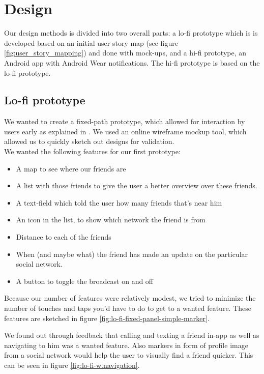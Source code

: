 \documentclass[runningheads,a4paper]{llncs}
\begin{document}
\section{Design}\label{design}
Our design methods is divided into two overall parts: a lo-fi prototype which is is developed based on an initial user story map (see figure \ref{fig:user_story_mapping}) and done with mock-ups, and a hi-fi prototype, an Android app with Android Wear notifications. The hi-fi prototype is based on the lo-fi prototype. 

\subsection{Lo-fi prototype}
We wanted to create a fixed-path prototype, which allowed for interaction by users early as explained in \cite{prototyping}. We used an online wireframe mockup tool\cite{ninja}, which allowed us to quickly sketch out designs for validation. \\


We wanted the following features for our first prototype: 
\begin{itemize}
  \item A map to see where our friends are 
	\item A list with those friends to give the user a better overview over these friends. 
	\item A text-field which told the user how many friends that’s near him
	\item An icon in the list, to show which network the friend is from
	\item Distance to each of the friends
	\item When (and maybe what) the friend has made an update on the particular social network.
	\item A button to toggle the broadcast on and off\\ 
\end{itemize}

Because our number of features were relatively modest, we tried to minimize the number of touches and taps you'd have to do to get to a wanted feature. These features are sketched in figure \ref{fig:lo-fi-fixed-panel-simple-marker}.

We found out through feedback that calling and texting a friend in-app as well as navigating to him was a wanted feature. Also markers in form of profile image from a social network would help the user to visually find a friend quicker. This can be seen in figure \ref{fig:lo-fi-w.navigation}. 
\end{document}
